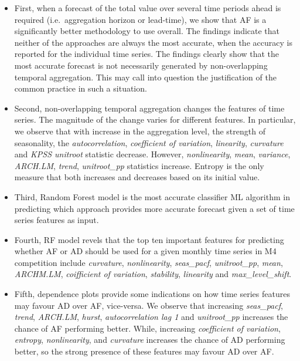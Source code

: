 \documentclass[preprint, 3p,
authoryear]{elsarticle} %
\begin{document}
\begin{itemize}
\item
  First, when a forecast of the total value over several time periods
  ahead is required (i.e.~aggregation horizon or lead-time), we show
  that AF is a significantly better methodology to use overall. The
  findings indicate that neither of the approaches are always the most
  accurate, when the accuracy is reported for the individual time
  series. The findings clearly show that the most accurate forecast is
  not necessarily generated by non-overlapping temporal aggregation.
  This may call into question the justification of the common practice
  in such a situation.
\item
  Second, non-overlapping temporal aggregation changes the features of
  time series. The magnitude of the change varies for different
  features. In particular, we observe that with increase in the
  aggregation level, the strength of seasonality, the
  \emph{autocorrelation}, \emph{coefficient of variation},
  \emph{linearity}, \emph{curvature} and \emph{KPSS unitroot} statistic
  decrease. However, \emph{nonlinearity}, \emph{mean}, \emph{variance},
  \emph{ARCH.LM}, \emph{trend}, \emph{unitroot\_pp} statistics increase.
  Entropy is the only measure that both increases and decreases based on
  its initial value.
\item
  Third, Random Forest model is the most accurate classifier ML
  algorithm in predicting which approach provides more accurate forecast
  given a set of time series features as input.
\item
  Fourth, RF model revels that the top ten important features for
  predicting whether AF or AD should be used for a given monthly time
  series in M4 competition include \emph{curvature},
  \emph{nonlinearity}, \emph{seas\_pacf}, \emph{unitroot\_pp},
  \emph{mean}, \emph{ARCHM.LM}, \emph{coifficient of variation},
  \emph{stability}, \emph{linearity} and \emph{max\_level\_shift}.
\item
  Fifth, dependence plots provide some indications on how time series
  features may favour AD over AF, vice-versa. We observe that increasing
  \emph{seas\_pacf}, \emph{trend}, \emph{ARCH.LM}, \emph{hurst},
  \emph{autocorrelation lag 1} and \emph{unitroot\_pp} increases the
  chance of AF performing better. While, increasing \emph{coefficient of
  variation}, \emph{entropy}, \emph{nonlinearity}, and \emph{curvature}
  increases the chance of AD performing better, so the strong presence
  of these features may favour AD over AF.
\end{itemize}
\end{document}
